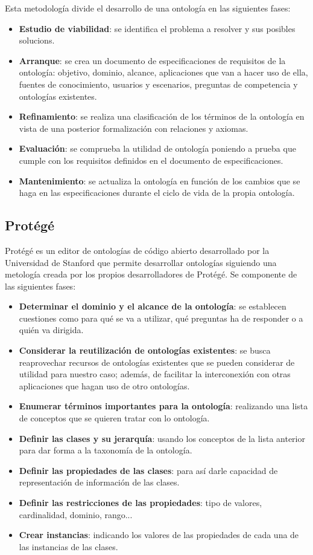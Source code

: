 Esta metodología divide el desarrollo de una ontología en las siguientes fases:

\begin{itemize}
	\item \textbf{Estudio de viabilidad}: se identifica el problema a resolver y sus posibles solucions.
	\item \textbf{Arranque}: se crea un documento de especificaciones de requisitos de la ontología: objetivo, dominio, alcance, aplicaciones que van a hacer uso de ella, fuentes de conocimiento, usuarios y escenarios, preguntas de competencia y ontologías existentes.
	\item \textbf{Refinamiento}: se realiza una clasificación de los términos de la ontología en vista de una posterior formalización con relaciones y axiomas.
	\item \textbf{Evaluación}: se comprueba la utilidad de ontología poniendo a prueba que cumple con los requisitos definidos en el documento de especificaciones.
	\item \textbf{Mantenimiento}: se actualiza la ontología en función de los cambios que se haga en las especificaciones durante el ciclo de vida de la propia ontología.
\end{itemize}

\subsection{Protégé}

Protégé es un editor de ontologías de código abierto desarrollado por la Universidad de Stanford que permite desarrollar ontologías siguiendo una metología creada por los propios desarrolladores de Protégé. Se componente de las siguientes fases:

\begin{itemize}
	\item \textbf{Determinar el dominio y el alcance de la ontología}: se establecen cuestiones como para qué se va a utilizar, qué preguntas ha de responder o a quién va dirigida.
	\item \textbf{Considerar la reutilización de ontologías existentes}: se busca reaprovechar recursos de ontologías existentes que se pueden considerar de utilidad para nuestro caso; además, de facilitar la interconexión con otras aplicaciones que hagan uso de otro ontologías.
	\item \textbf{Enumerar términos importantes para la ontología}: realizando una lista de conceptos que se quieren tratar con lo ontología.
	\item \textbf{Definir las clases y su jerarquía}: usando los conceptos de la lista anterior para dar forma a la taxonomía de la ontología.
	\item \textbf{Definir las propiedades de las clases}: para así darle capacidad de representación de información de las clases.
	\item \textbf{Definir las restricciones de las propiedades}: tipo de valores, cardinalidad, dominio, rango...
	\item \textbf{Crear instancias}: indicando los valores de las propiedades de cada una de las instancias de las clases.
\end{itemize}
	
